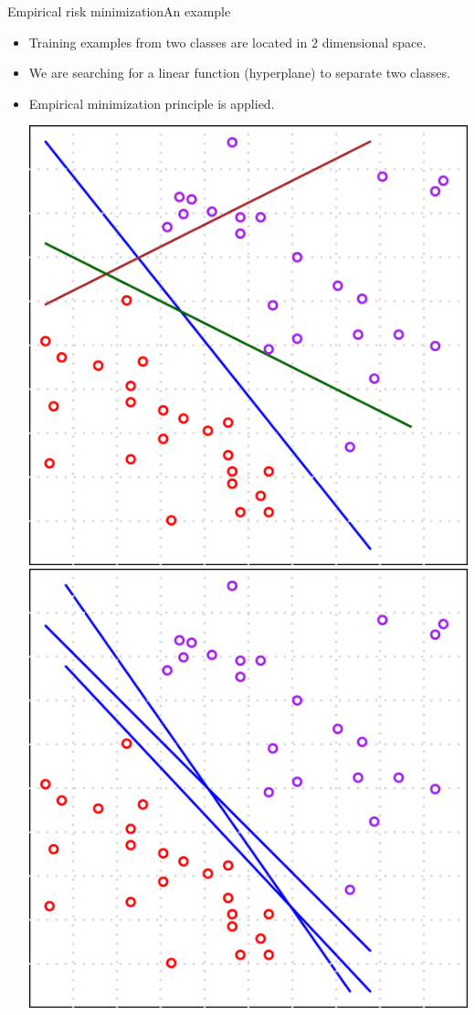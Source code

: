 \documentclass[first=dgreen,second=purple,logo=yellowexc]{aaltoslides}
\begin{document}
{\begin{frame}{Empirical risk minimization}{An example}
	\begin{itemize}
		\item Training examples from two classes are located in $2$ dimensional space.
		\item We are searching for a linear function (hyperplane) to separate two classes.
		\item Empirical minimization principle is applied.
		\begin{center}
			\includegraphics[scale=0.1]{./figures/empirical_risk_1.pdf}
			\text{      }
			\includegraphics[scale=0.1]{./figures/empirical_risk_2.pdf}

\end{center}
\end{itemize}
\end{frame}}
\end{document}
